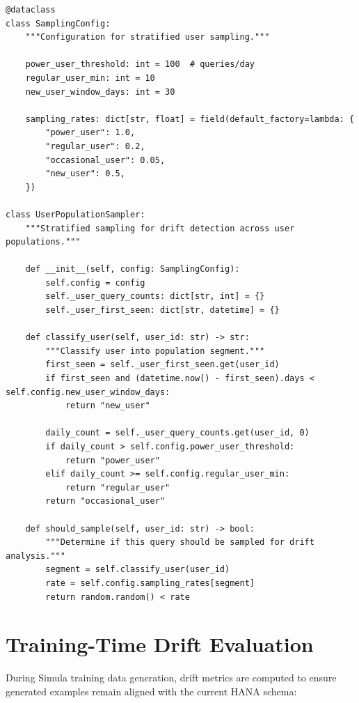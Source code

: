 \begin{lstlisting}[language=jsonx,caption={User population sampler (simula\_tts\_drift\_sampler.py)}]
@dataclass
class SamplingConfig:
    """Configuration for stratified user sampling."""
    
    power_user_threshold: int = 100  # queries/day
    regular_user_min: int = 10
    new_user_window_days: int = 30
    
    sampling_rates: dict[str, float] = field(default_factory=lambda: {
        "power_user": 1.0,
        "regular_user": 0.2,
        "occasional_user": 0.05,
        "new_user": 0.5,
    })

class UserPopulationSampler:
    """Stratified sampling for drift detection across user populations."""
    
    def __init__(self, config: SamplingConfig):
        self.config = config
        self._user_query_counts: dict[str, int] = {}
        self._user_first_seen: dict[str, datetime] = {}
    
    def classify_user(self, user_id: str) -> str:
        """Classify user into population segment."""
        first_seen = self._user_first_seen.get(user_id)
        if first_seen and (datetime.now() - first_seen).days < self.config.new_user_window_days:
            return "new_user"
        
        daily_count = self._user_query_counts.get(user_id, 0)
        if daily_count > self.config.power_user_threshold:
            return "power_user"
        elif daily_count >= self.config.regular_user_min:
            return "regular_user"
        return "occasional_user"
    
    def should_sample(self, user_id: str) -> bool:
        """Determine if this query should be sampled for drift analysis."""
        segment = self.classify_user(user_id)
        rate = self.config.sampling_rates[segment]
        return random.random() < rate
\end{lstlisting}

\section{Training-Time Drift Evaluation}

During Simula training data generation, drift metrics are computed to ensure
generated examples remain aligned with the current HANA schema:

